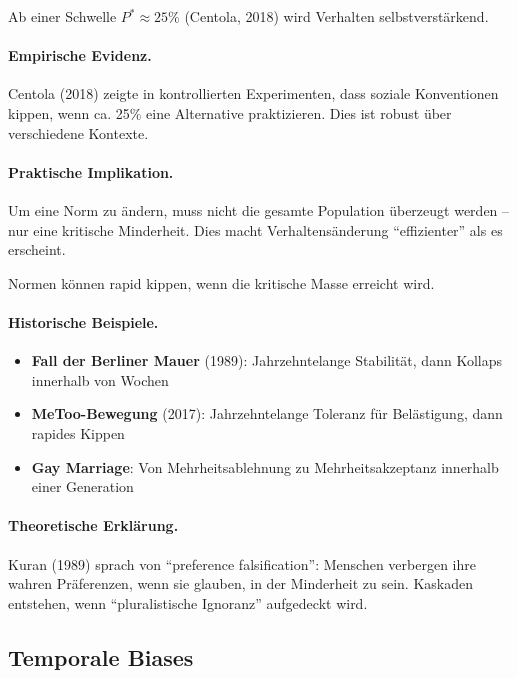 \begin{axiom}
Ab einer Schwelle $P^* \approx 25\%$ (Centola, 2018) wird Verhalten selbstverstärkend.

\paragraph{Empirische Evidenz.}
Centola (2018) zeigte in kontrollierten Experimenten, dass soziale Konventionen kippen, wenn ca. 25\% eine Alternative praktizieren. Dies ist robust über verschiedene Kontexte.

\paragraph{Praktische Implikation.}
Um eine Norm zu ändern, muss nicht die gesamte Population überzeugt werden -- nur eine kritische Minderheit. Dies macht Verhaltensänderung ``effizienter'' als es erscheint.
\end{axiom}

\begin{axiom}
Normen können rapid kippen, wenn die kritische Masse erreicht wird.

\paragraph{Historische Beispiele.}
\begin{itemize}
    \item \textbf{Fall der Berliner Mauer} (1989): Jahrzehntelange Stabilität, dann Kollaps innerhalb von Wochen
    \item \textbf{MeToo-Bewegung} (2017): Jahrzehntelange Toleranz für Belästigung, dann rapides Kippen
    \item \textbf{Gay Marriage}: Von Mehrheitsablehnung zu Mehrheitsakzeptanz innerhalb einer Generation
\end{itemize}

\paragraph{Theoretische Erklärung.}
Kuran (1989) sprach von ``preference falsification'': Menschen verbergen ihre wahren Präferenzen, wenn sie glauben, in der Minderheit zu sein. Kaskaden entstehen, wenn ``pluralistische Ignoranz'' aufgedeckt wird.
\end{axiom}

\subsection{Temporale Biases}

